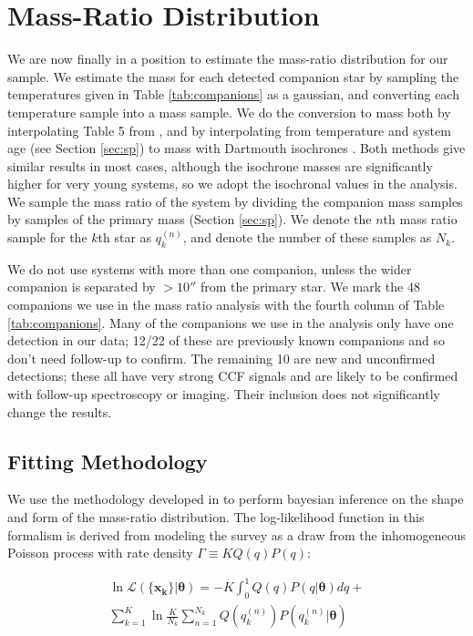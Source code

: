 \documentclass{emulateapj}
\renewcommand{\vec}[1]{\bm{#1}}
\begin{document}
\section{Mass-Ratio Distribution}
\label{sec:mrd}

We are now finally in a position to estimate the mass-ratio distribution for our sample. We estimate the mass for each detected companion star by sampling the temperatures given in Table \ref{tab:companions} as a gaussian, and converting each temperature sample into a mass sample. We do the conversion to mass both by interpolating Table 5 from \citet{Pecaut2013}, and by interpolating from temperature and system age (see Section \ref{sec:sp}) to mass with Dartmouth isochrones \citep{Dotter2008}. Both methods give similar results in most cases, although the isochrone masses are significantly higher for very young systems, so we adopt the isochronal values in the analysis. We sample the mass ratio of the system by dividing the companion mass samples by samples of the primary mass (Section \ref{sec:sp}). We denote the $n$th mass ratio sample for the $k$th star as $q_k^{(n)}$, and denote the number of these samples as $N_k$.

We do not use systems with more than one companion, unless the wider companion is separated by $ > 10''$ from the primary star. We mark the 48 companions we use in the mass ratio analysis with the fourth column of Table \ref{tab:companions}. Many of the companions we use in the analysis only have one detection in our data; 12/22 of these are previously known companions and so don't need follow-up to confirm. The remaining 10 are new and unconfirmed detections; these all have very strong CCF signals and are likely to be confirmed with follow-up spectroscopy or imaging. Their inclusion does not significantly change the results.


\subsection{Fitting  Methodology}

We use the methodology developed in \citet{Foreman2014} to perform bayesian inference on the shape and form of the mass-ratio distribution. The log-likelihood function in this formalism is derived from modeling the survey as a draw from the inhomogeneous Poisson process with rate density $\Gamma \equiv KQ(q)P(q)$:

\begin{multline}
\ln{\mathcal{L}(\{\vec{x_k}\}| \vec{\theta})} = -K \int_0^1 Q(q)P(q|\vec{\theta})dq + \\ \sum_{k=1}^K \ln{\frac{K}{N_k} \sum_{n=1}^{N_k} Q(q_k^{(n)}) P(q_k^{(n)}|\vec{\theta})}
\label{eqn:money}
\end{multline}
\end{document}
